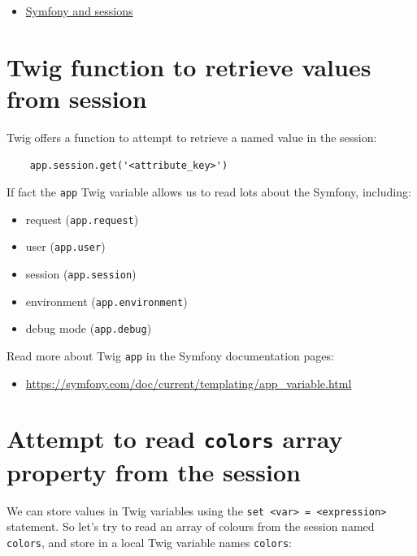 \documentclass[a4paperpaper,openright]{book}
\providecommand{\tightlist}{%
  \setlength{\itemsep}{0pt}\setlength{\parskip}{0pt}}
\begin{document}
\begin{itemize}
\tightlist
\item
  \href{http://symfony.com/doc/current/components/http_foundation/sessions.html}{Symfony
  and sessions}
\end{itemize}

\hypertarget{twig-function-to-retrieve-values-from-session}{%
\section{Twig function to retrieve values from
session}\label{twig-function-to-retrieve-values-from-session}}

Twig offers a function to attempt to retrieve a named value in the
session:

\begin{verbatim}
    app.session.get('<attribute_key>')
\end{verbatim}

If fact the \texttt{app} Twig variable allows us to read lots about the
Symfony, including:

\begin{itemize}
\item
  request (\texttt{app.request})
\item
  user (\texttt{app.user})
\item
  session (\texttt{app.session})
\item
  environment (\texttt{app.environment})
\item
  debug mode (\texttt{app.debug})
\end{itemize}

Read more about Twig \texttt{app} in the Symfony documentation pages:

\begin{itemize}
\tightlist
\item
  \url{https://symfony.com/doc/current/templating/app_variable.html}
\end{itemize}

\hypertarget{attempt-to-read-colors-array-property-from-the-session}{%
\section{\texorpdfstring{Attempt to read \texttt{colors} array property
from the
session}{Attempt to read colors array property from the session}}\label{attempt-to-read-colors-array-property-from-the-session}}

We can store values in Twig variables using the
\texttt{set\ \textless{}var\textgreater{}\ =\ \textless{}expression\textgreater{}}
statement. So let's try to read an array of colours from the session
named \texttt{colors}, and store in a local Twig variable names
\texttt{colors}:
\end{document}
